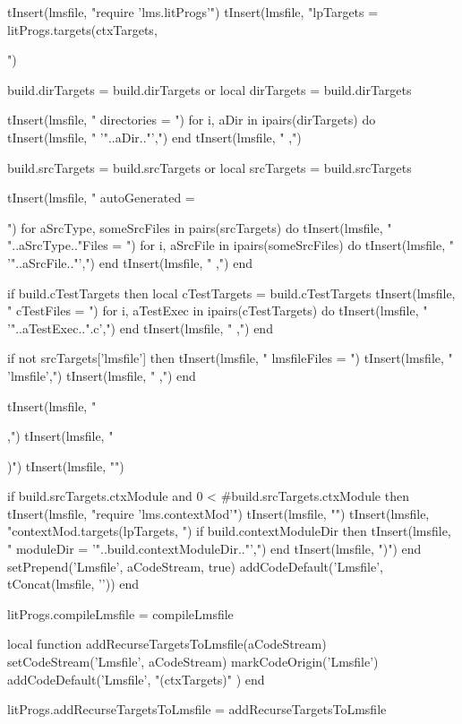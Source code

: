   tInsert(lmsfile, "require 'lms.litProgs'\n")
  tInsert(lmsfile, "lpTargets = litProgs.targets(ctxTargets, {")
  
  build.dirTargets = build.dirTargets or { }
  local dirTargets = build.dirTargets
  
  tInsert(lmsfile, "  directories = {")
  for i, aDir in ipairs(dirTargets) do
    tInsert(lmsfile, "    '"..aDir.."',")
  end
  tInsert(lmsfile, "  },")
  
  build.srcTargets = build.srcTargets or { }
  local srcTargets = build.srcTargets
  
  tInsert(lmsfile, "  autoGenerated = {")
  for aSrcType, someSrcFiles in pairs(srcTargets) do
    tInsert(lmsfile, "    "..aSrcType.."Files = {")
    for i, aSrcFile in ipairs(someSrcFiles) do
      tInsert(lmsfile, "      '"..aSrcFile.."',")
    end
    tInsert(lmsfile, "    },")
  end
  
  if build.cTestTargets then
    local cTestTargets = build.cTestTargets
    tInsert(lmsfile, "    cTestFiles = {")
    for i, aTestExec in ipairs(cTestTargets) do
      tInsert(lmsfile, "      '"..aTestExec..".c',")
    end
    tInsert(lmsfile, "    },")
  end
  
  if not srcTargets['lmsfile'] then
    tInsert(lmsfile, "    lmsfileFiles = {")
    tInsert(lmsfile, "      'lmsfile',")
    tInsert(lmsfile, "    },")
  end
  
  tInsert(lmsfile, "  },")
  tInsert(lmsfile, "})")
  tInsert(lmsfile, "")
    
  if build.srcTargets.ctxModule and 0 < #build.srcTargets.ctxModule then
    tInsert(lmsfile, "require 'lms.contextMod'")
    tInsert(lmsfile, "")
    tInsert(lmsfile, "contextMod.targets(lpTargets, {")
      if build.contextModuleDir then
        tInsert(lmsfile, "  moduleDir = '"..build.contextModuleDir.."',")
      end
    tInsert(lmsfile, "})")
  end
  setPrepend('Lmsfile', aCodeStream, true)
  addCodeDefault('Lmsfile', tConcat(lmsfile, '\n'))
end

litProgs.compileLmsfile = compileLmsfile

local function addRecurseTargetsToLmsfile(aCodeStream)
  setCodeStream('Lmsfile', aCodeStream)
  markCodeOrigin('Lmsfile')
  addCodeDefault('Lmsfile', "\n\nrecurseTargets(ctxTargets)\n" )
end

litProgs.addRecurseTargetsToLmsfile = addRecurseTargetsToLmsfile

\stopLuaCode

\stopchapter
